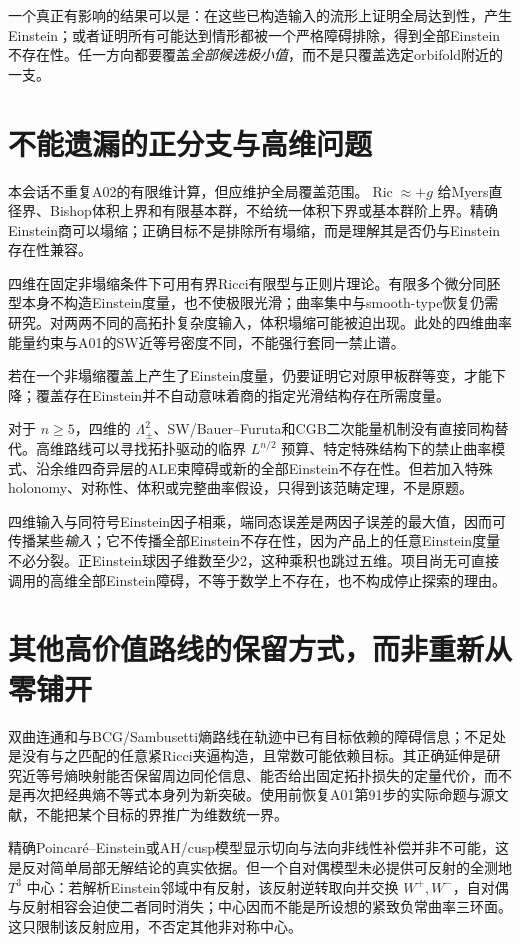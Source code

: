 \documentclass[UTF8,a4paper,11pt,fontset=fandol]{ctexart}
\numberwithin{equation}{section}
\theoremstyle{definition}
\newcommand{\Ric}{\operatorname{Ric}}
\begin{document}
一个真正有影响的结果可以是：在这些已构造输入的流形上证明全局达到性，产生Einstein；或者证明所有可能达到情形都被一个严格障碍排除，得到全部Einstein不存在性。任一方向都要覆盖\emph{全部候选极小值}，而不是只覆盖选定orbifold附近的一支。

\section{不能遗漏的正分支与高维问题}
本会话不重复A02的有限维计算，但应维护全局覆盖范围。$\Ric\approx+g$ 给Myers直径界、Bishop体积上界和有限基本群，不给统一体积下界或基本群阶上界。精确Einstein商可以塌缩；正确目标不是排除所有塌缩，而是理解其是否仍与Einstein存在性兼容。

四维在固定非塌缩条件下可用有界Ricci有限型与正则片理论\cite{CN}。有限多个微分同胚型本身不构造Einstein度量，也不使极限光滑；曲率集中与smooth-type恢复仍需研究。对两两不同的高拓扑复杂度输入，体积塌缩可能被迫出现。此处的四维曲率能量约束与A01的SW近等号密度不同，不能强行套同一禁止谱。

若在一个非塌缩覆盖上产生了Einstein度量，仍要证明它对原甲板群等变，才能下降；覆盖存在Einstein并不自动意味着商的指定光滑结构存在所需度量。

对于 $n\ge5$，四维的 $\Lambda^2_\pm$、SW/Bauer--Furuta和CGB二次能量机制没有直接同构替代。高维路线可以寻找拓扑驱动的临界 $L^{n/2}$ 预算、特定特殊结构下的禁止曲率模式、沿余维四奇异层的ALE束障碍或新的全部Einstein不存在性。但若加入特殊holonomy、对称性、体积或完整曲率假设，只得到该范畴定理，不是原题。

四维输入与同符号Einstein因子相乘，端同态误差是两因子误差的最大值，因而可传播某些\emph{输入}；它不传播全部Einstein不存在性，因为产品上的任意Einstein度量不必分裂。正Einstein球因子维数至少2，这种乘积也跳过五维。项目尚无可直接调用的高维全部Einstein障碍，不等于数学上不存在，也不构成停止探索的理由。


\section{其他高价值路线的保留方式，而非重新从零铺开}
双曲连通和与BCG/Sambusetti熵路线在轨迹中已有目标依赖的障碍信息；不足处是没有与之匹配的任意紧Ricci夹逼构造，且常数可能依赖目标。其正确延伸是研究近等号熵映射能否保留周边同伦信息、能否给出固定拓扑损失的定量代价，而不是再次把经典熵不等式本身列为新突破。使用前恢复A01第91步的实际命题与源文献，不能把某个目标的界推广为维数统一界。

精确Poincar\'e--Einstein或AH/cusp模型显示切向与法向非线性补偿并非不可能，这是反对简单局部无解结论的真实依据。但一个自对偶模型未必提供可反射的全测地 $T^3$ 中心：若解析Einstein邻域中有反射，该反射逆转取向并交换 $W^+,W^-$，自对偶与反射相容会迫使二者同时消失；中心因而不能是所设想的紧致负常曲率三环面。这只限制该反射应用，不否定其他非对称中心。
\end{document}
